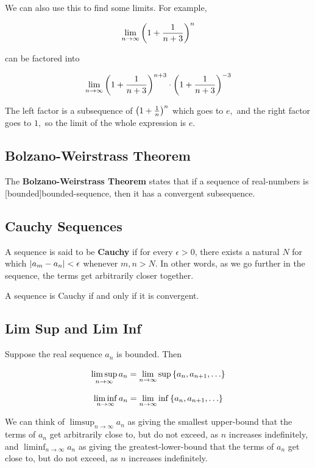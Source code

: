 \documentclass{article}
\begin{document}
We can also use this to find some limits. For example,

\[ \lim_{n \to \infty} \left(1 + \frac{1}{n+3}\right)^n \]

can be factored into

\[ \lim_{n \to \infty} \left(1 + \frac{1}{n+3}\right)^{n+3} \cdot \left(1 + \frac{1}{n+3}\right)^{-3} \]

The left factor is a subsequence of $\left(1 + \frac{1}{n}\right)^n$ which goes to $e,$ and the right factor goes to $1,$ so the limit of the whole expression is $e.$

\subsection{Bolzano-Weirstrass Theorem}

The \textbf{Bolzano-Weirstrass Theorem} states that if a sequence of \@{real-numbers} is \@[bounded]{bounded-sequence}, then it has a \@{convergent} \@{subsequence}.

\subsection{Cauchy Sequences}

A sequence is said to be \textbf{Cauchy} if for every $\epsilon > 0$, there exists a \@{natural} $N$ for which $\left| a_m - a_n \right| < \epsilon$ whenever $m, n > N.$  In other words, as we go further in the sequence, the terms get arbitrarily closer together.

A sequence is \@{Cauchy} if and only if it is \@{convergent}.

\subsection{Lim Sup and Lim Inf}

Suppose the real sequence $a_n$ is bounded. Then

\[ \limsup_{n \to \infty} a_n = \lim_{n \to \infty} \sup\set{a_n, a_{n+1}, \dots} \]

\[ \liminf_{n \to \infty} a_n = \lim_{n \to \infty} \inf\set{a_n, a_{n+1}, \dots} \]

We can think of $\limsup_{n \to \infty}{a_n}$ as giving the smallest \@{upper-bound} that the terms of $a_n$ get arbitrarily close to, but do not exceed, as $n$ increases indefinitely, and $\liminf_{n \to \infty}{a_n}$ as giving the \@{greatest-lower-bound} that the terms of $a_n$ get close to, but do not exceed, as $n$ increases indefinitely.
\end{document}
